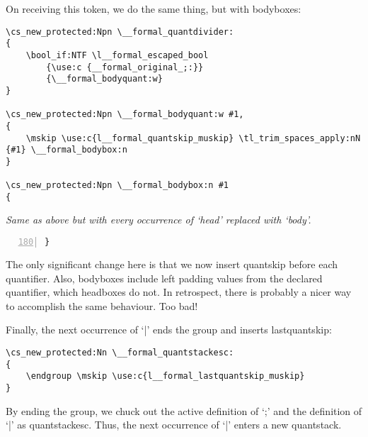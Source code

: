 \documentclass{article}
\begin{document}
\noindent On receiving this token, we do the same thing, but with bodyboxes:
\vspace{\topsep}
\begin{Verbatim}[vspace=0pt]
\cs_new_protected:Npn \__formal_quantdivider:
{
    \bool_if:NTF \l__formal_escaped_bool 
        {\use:c {__formal_original_;:}}
        {\__formal_bodyquant:w}
}

\cs_new_protected:Npn \__formal_bodyquant:w #1,
{
    \mskip \use:c{l__formal_quantskip_muskip} \tl_trim_spaces_apply:nN {#1} \__formal_bodybox:n
}

\cs_new_protected:Npn \__formal_bodybox:n #1
{
\end{Verbatim}
\qquad\quad \emph{Same as above but with every occurrence of `head' replaced with `body'.}
\begin{Verbatim}[numbers=left,xleftmargin=5mm,firstnumber=180,vspace=0pt]
}
\end{Verbatim}
\vspace{\topsep}
The only significant change here is that we now insert quantskip before each quantifier. Also, bodyboxes include left padding values from the declared quantifier, which headboxes do not. In retrospect, there is probably a nicer way to accomplish the same behaviour. Too bad!
\\\mbox{}

\noindent Finally, the next occurrence of `|' ends the group and inserts lastquantskip:
\begin{Verbatim}
\cs_new_protected:Nn \__formal_quantstackesc:
{
    \endgroup \mskip \use:c{l__formal_lastquantskip_muskip}
} 
\end{Verbatim}
By ending the group, we chuck out the active definition of `;' and the definition of `|' as quantstackesc. Thus, the next occurrence of `|' enters a new quantstack.
\\\mbox{}
\end{document}
